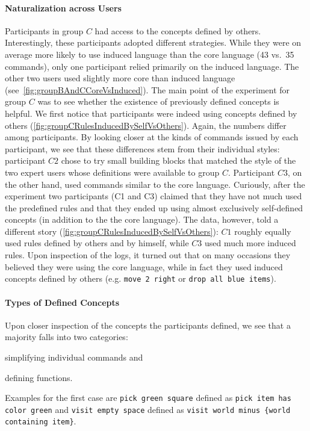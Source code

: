 \documentclass[letterpaper, 10 pt, conference]{ieeeconf}  %
\begin{document}
\paragraph*{\textbf{Naturalization across Users}}
Participants in group $C$ had access to the concepts defined by others. Interestingly, these
participants adopted different strategies. While they were on average more likely to use induced
language than the core language (43 vs.\ 35 commands), only one participant relied primarily on the induced language.
The other two users used slightly more core than induced language (see~\autoref{fig:groupBAndCCoreVsInduced}).
The main point of the experiment for group $C$ was to see whether the existence of previously defined concepts is helpful.
We first notice that participants were indeed using concepts defined by others (\autoref{fig:groupCRulesInducedBySelfVsOthers}). 
Again, the numbers differ among participants. 
By looking closer at the kinds of commands issued by each participant, we see that these differences 
stem from their individual styles: participant $C2$ chose to try small building blocks that matched the style of 
the two expert users whose definitions were available to group $C$. 
Participant $C3$, on the other hand, used commands similar to the core language.
Curiously, after the experiment two participants (C1 and C3) claimed that they have not much used the predefined rules 
and that they ended up using almost exclusively self-defined concepts (in addition to the the core language). 
The data, however, told a different story (\autoref{fig:groupCRulesInducedBySelfVsOthers}): $C1$ roughly equally used rules defined by others and by himself, while $C3$ 
used much more induced rules. 
Upon inspection of the logs, it turned out that on many occasions they believed they were using the core language, while in fact they used induced concepts
defined by others
(e.g. \lstinline{move 2 right} or \lstinline{drop all blue items}).

\paragraph*{\textbf{Types of Defined Concepts}}
Upon closer inspection of the concepts the participants defined, we see that a majority falls into two categories:
\begin{inparaenum}[(1)]
\item simplifying individual commands and
\item defining functions.
\end{inparaenum}
%
Examples for the first case are
\lstinline{pick green square} defined as \lstinline{pick item has color green} and
\lstinline{visit empty space} defined as \lstinline$visit world minus {world containing item}$.
\end{document}
